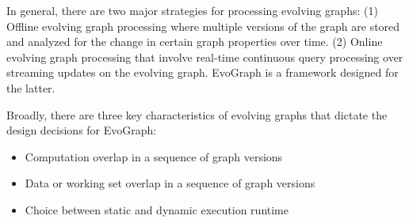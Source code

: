 %
%
%
%


In general, there are two major strategies for processing evolving graphs: (1) Offline evolving graph processing where multiple versions of the graph are stored and analyzed for the change in certain graph properties over time. (2) Online evolving graph processing that involve real-time continuous query processing over streaming updates on the evolving graph. EvoGraph is a framework designed for the latter. 

Broadly, there are three key characteristics of evolving graphs that dictate the design decisions for EvoGraph: 


\begin{itemize}
  \item Computation overlap in a sequence of graph versions
  \item Data or working set overlap in a sequence of graph versions
  \item Choice between static and dynamic execution runtime
\end{itemize}

